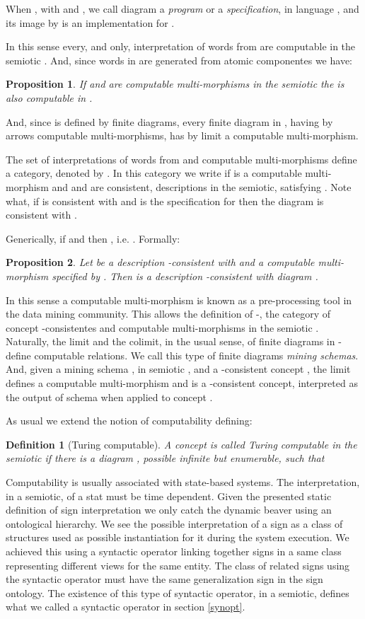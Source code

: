 \documentclass[oribibl]{llncs}
\newtheorem{prop}{Proposition}
\newtheorem{defn}{Definition}
\begin{document}
When , with  and , we call diagram  a \emph{program} or a \emph{specification}, in language , and its image by  is an implementation for .

In this sense every, and only, interpretation of words from  are computable in the semiotic . And, since words in  are generated from atomic componentes we have:
\begin{prop}
If  and  are computable multi-morphisms in the semiotic  the  is also computable in .
\end{prop}

And, since  is defined by finite diagrams, every finite diagram  in , having by arrows computable multi-morphisms, has by limit a computable multi-morphism.

The set of interpretations of words from  and computable multi-morphisms define a category, denoted by . In this category we write  if  is a computable multi-morphism and  and  are consistent, descriptions in the semiotic, satisfying . Note what, if  is consistent with  and  is the specification for  then the diagram  is consistent with .


Generically, if  and  then , i.e. . Formally:
\begin{prop}
 Let  be a description -consistent with  and  a computable multi-morphism specified by . Then  is a description  -consistent with diagram .
\end{prop}

In this sense a computable multi-morphism is known as a pre-processing tool in the data mining community. This allows the definition of -, the category of concept -consistentes and  computable multi-morphisms in the semiotic . Naturally, the limit and the colimit, in the usual sense, of finite diagrams in - define computable relations. We call this type of finite diagrams \emph{mining schemas}. And, given a mining schema , in semiotic , and a -consistent concept , the limit  defines a computable multi-morphism and  is a -consistent concept, interpreted as the output of schema  when applied to concept .

As usual we extend the notion of computability defining:
\begin{defn}[Turing computable]
A concept  is called \emph{Turing computable} in the semiotic  if there is a diagram , possible infinite but enumerable, such that 
\end{defn}

Computability is usually associated with state-based systems. The interpretation, in a semiotic, of a stat must be time dependent. Given the presented static definition of sign interpretation we only catch the dynamic beaver using an ontological hierarchy. We see the possible interpretation of a sign as a class of structures used as possible instantiation for it during the system execution. We achieved this using a syntactic operator linking together signs in a same class representing different views for the same entity. The class of related signs using the syntactic operator must have the same generalization sign in the sign ontology. The existence of this type of syntactic operator, in a semiotic, defines what we called a syntactic operator in section \ref{synopt}.
\end{document}
